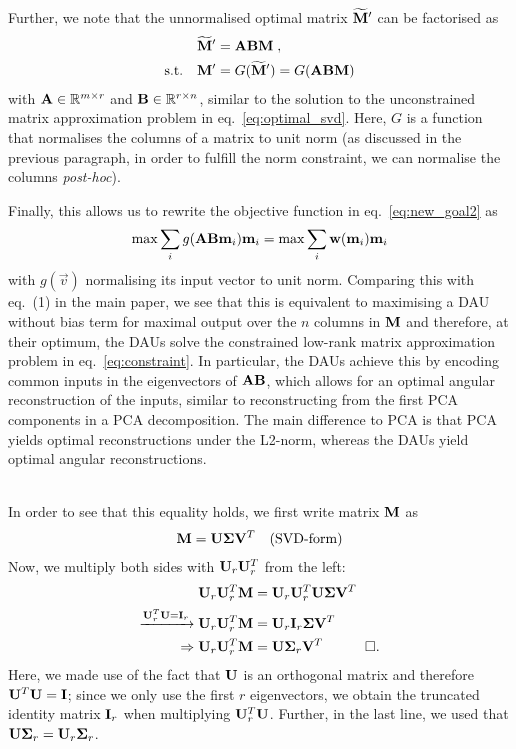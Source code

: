 Further, we note that the unnormalised optimal matrix $\widetilde{\mat m}'$ can be factorised as 
\begin{align}
    \label{eq:factorise}
    &\widetilde{\mat m}' = \mat a\mat b\mat m \; ,\\
    \text{s.t.}\quad  &\mat m' = G(\widetilde{\mat m}') = G(\mat{ABM})
\end{align}
with $\mat A\in \mathbb R^{m\times r}$ and $\mat b \in \mathbb R^{r\times n}$, similar to the solution to the unconstrained matrix approximation problem in eq.~\eqref{eq:optimal_svd}.
Here, $G$ is a function that normalises the columns of a matrix to unit norm (as discussed in the previous paragraph, in order to fulfill the norm constraint, we can normalise the columns \emph{post-hoc}).

Finally, this allows us to rewrite the objective function in eq.~\eqref{eq:new_goal2} as
\begin{align}
    \max \sum_i g(\mat{AB}\vec m_i)\vec m_i =\max \sum_i \vec w(\vec m_i)\vec m_i
\end{align}
with $g(\vec v)$ normalising its input vector to unit norm. 
Comparing this with eq.~(1) in the main paper, we see that this is equivalent to maximising a DAU without bias term for maximal output over the $n$ columns in $\mat m$ and therefore, at their optimum, the DAUs solve the constrained low-rank matrix approximation problem in eq.~\eqref{eq:constraint}. In particular, the DAUs achieve this by encoding common inputs in the eigenvectors of $\mat{ab}$, which allows for an optimal angular reconstruction of the inputs, similar to reconstructing from the first PCA components in a PCA decomposition.
The main difference to PCA is that PCA yields optimal reconstructions under the L2-norm, whereas the DAUs yield optimal angular reconstructions.

\\
In order to see that this equality holds, we first write matrix $\mat m$ as
\begin{align}
 \mat m = \mat U\mat \Sigma\mat v^T \quad (\text{SVD-form})
\end{align}
Now, we multiply both sides with $\mat U_r\mat U_r^T$ from the left:
\begin{align}
  \mat u_r \mat U^T_r  \mat M  &= \mat u_r \mat u_r^T\mat U\mat \Sigma\mat v^T \\
 \xrightarrow{\mat U_r^T \mat U = \mat I_r}
 \mat u_r \mat U^T_r  \mat M  &= \mat u_r \mat I_r\mat \Sigma\mat v^T \\
 \Rightarrow \mat u_r \mat U^T_r  \mat M  &= \mat U\mat \Sigma_r\mat v^T\quad \qed.
\end{align}
Here, we made use of the fact that $\mat u$ is an orthogonal matrix and therefore $\mat U^T\mat u =\mat I$; since we only use the first $r$ eigenvectors, we obtain the truncated identity matrix $\mat i_r$ when multiplying $\mat u^T_r\mat u$.
Further, in the last line, we used that $\mat u\mat\Sigma_r = \mat U_r\mat \Sigma_r$.

